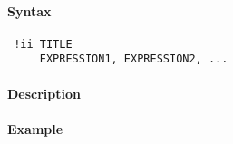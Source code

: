 


	\paragraph{Syntax}
 
 \begin{verbatim}
 !ii TITLE
     EXPRESSION1, EXPRESSION2, ...
 \end{verbatim}
 
 \paragraph{Description}
 
 \paragraph{Example}


